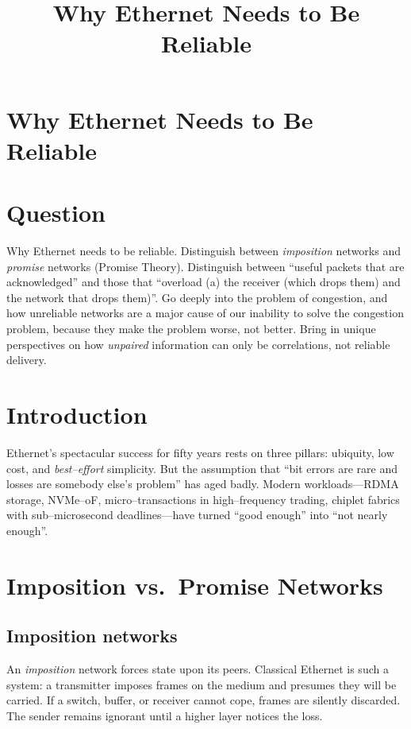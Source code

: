 \documentclass[../HFT-main.tex]{subfiles}
\title{Why Ethernet Needs to Be Reliable}
\begin{document}
\section{Why Ethernet Needs to Be Reliable}


 

\section*{Question}
Why Ethernet needs to be reliable.  Distinguish between \emph{imposition}
networks and \emph{promise} networks (Promise Theory).  Distinguish between
``useful packets that are acknowledged'' and those that ``overload (a) the
receiver (which drops them) and the network that drops them)''.  Go deeply
into the problem of congestion, and how unreliable networks are a major
cause of our inability to solve the congestion problem, because they make
the problem worse, not better.  Bring in unique perspectives on how
\emph{unpaired} information can only be correlations, not reliable
delivery.

\section{Introduction}
Ethernet's spectacular success for fifty years rests on three pillars:
ubiquity, low cost, and \emph{best--effort} simplicity.  But the assumption
that ``bit errors are rare and losses are somebody else's problem'' has
aged badly.  Modern workloads---RDMA storage, NVMe--oF, micro--transactions
in high--frequency trading, chiplet fabrics with sub--microsecond
deadlines---have turned ``good enough'' into ``not nearly enough''.

\section{Imposition vs.\ Promise Networks}

\subsection{Imposition networks}
An \emph{imposition} network forces state upon its peers.  Classical
Ethernet is such a system: a transmitter imposes frames on the medium and
presumes they will be carried.  If a switch, buffer, or receiver cannot
cope, frames are silently discarded.  The sender remains ignorant until a
higher layer notices the loss.
\end{document}
